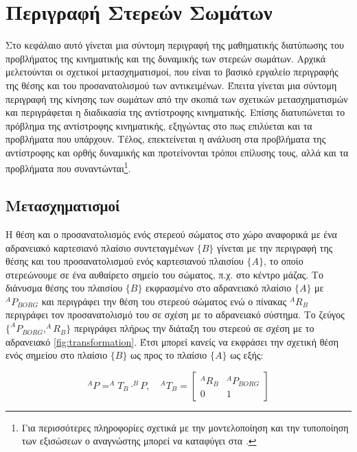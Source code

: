 \chapter{Περιγραφή Στερεών Σωμάτων}

Στο κεφάλαιο αυτό γίνεται μια σύντομη περιγραφή της μαθηματικής διατύπωσης του προβλήματος της κινηματικής και της δυναμικής των στερεών σωμάτων. Αρχικά μελετούνται οι σχετικοί μετασχηματισμοί, που είναι το βασικό εργαλείο περιγραφής της θέσης και του προσανατολισμού των αντικειμένων. Έπειτα γίνεται μια σύντομη περιγραφή της κίνησης των σωμάτων από την σκοπιά των σχετικών μετασχηματισμών και περιγράφεται η διαδικασία της αντίστροφης κινηματικής. Επίσης διατυπώνεται το πρόβλημα της αντίστροφης κινηματικής, εξηγώντας στο πως επιλύεται και τα προβλήματα που υπάρχουν. Τέλος, επεκτείνεται η ανάλυση στα προβλήματα της αντίστροφης και ορθής δυναμικής και προτείνονται τρόποι επίλυσης τους, αλλά και τα προβλήματα που συναντώνται\footnote{Για περισσότερες πληροφορίες σχετικά με την μοντελοποίηση και την τυποποίηση των εξισώσεων ο αναγνώστης μπορεί να καταφύγει στα \cite{craig95, murray94}.}.

\section{Μετασχηματισμοί}

Η θέση και ο προσανατολισμός ενός στερεού σώματος στο χώρο αναφορικά με ένα αδρανειακό καρτεσιανό πλαίσιο συντεταγμένων $\{Β\}$ γίνεται με την περιγραφή της θέσης και του προσανατολισμού ενός καρτεσιανού πλαισίου $\{Α\}$, το οποίο στερεώνουμε σε ένα αυθαίρετο σημείο του σώματος, π.χ. στο κέντρο μάζας. Το διάνυσμα θέσης του πλαισίου $\{Β\}$ εκφρασμένο στο αδρανειακό πλαίσιο $\{Α\}$ με $^AP_{BORG}$ και περιγράφει την θέση του στερεού σώματος ενώ ο πίνακας $^AR_B$ περιγράφει τον προσανατολισμό του σε σχέση με το αδρανειακό σύστημα. Το ζεύγος $\{^AP_{BORG}, ^AR_B\}$ περιγράφει πλήρως την διάταξη του στερεού σε σχέση με το αδρανειακό \ref{fig:transformation}. Έτσι μπορεί κανείς να εκφράσει την σχετική θέση ενός σημείου στο πλαίσιο $\{Β\}$ ως προς το πλαίσιο  $\{Α\}$ ως εξής:

\begin{equation}
    ^AP = ^AT_B \cdot ^BP, \quad
    ^AT_B =
    \begin{bmatrix}
        ^AR_B & ^AP_{BORG}\\
        0 & 1
    \end{bmatrix}
\end{equation}

